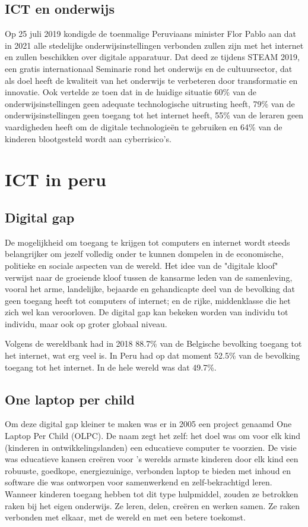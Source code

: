 \subsection{ICT en onderwijs}
Op 25 juli 2019 kondigde de toenmalige Peruviaans minister Flor Pablo aan dat in 2021 alle stedelijke onderwijsinstellingen verbonden zullen zijn met het internet en zullen beschikken over digitale apparatuur. Dat deed ze tijdens STEAM 2019, een gratis internationaal Seminarie rond het onderwijs en de cultuursector, dat als doel heeft de kwaliteit van het onderwijs te verbeteren door transformatie en innovatie. Ook vertelde ze toen dat in de huidige situatie 60\% van de onderwijsinstellingen geen adequate technologische uitrusting heeft, 79\% van de onderwijsinstellingen geen toegang tot het internet heeft, 55\% van de leraren geen vaardigheden heeft om de digitale technologieën te gebruiken en 64\% van de kinderen blootgesteld wordt aan cyberrisico's. \autocite{Ministerio de Educación}

\section{ICT in peru}
\subsection{Digital gap}
De mogelijkheid om toegang te krijgen tot computers en internet wordt steeds belangrijker om jezelf volledig onder te kunnen dompelen in de economische, politieke en sociale aspecten van de wereld. Het idee van de "digitale kloof" verwijst naar de groeiende kloof tussen de kansarme leden van de samenleving, vooral het arme, landelijke, bejaarde en gehandicapte deel van de bevolking dat geen toegang heeft tot computers of internet; en de rijke, middenklasse die het zich wel kan veroorloven. De digital gap kan bekeken worden van individu tot individu, maar ook op groter globaal niveau. \autocite{Marichick2000}

Volgens de wereldbank had in 2018 88.7\% van de Belgische bevolking toegang tot het internet, wat erg veel is. In Peru had op dat moment 52.5\% van de bevolking toegang tot het internet. In de hele wereld was dat 49.7\%. \autocite{WereldBank2018}

\subsection{One laptop per child}
Om deze digital gap kleiner te maken was er in 2005 een project genaamd One Laptop Per Child (OLPC). De naam zegt het zelf: het doel was om voor elk kind (kinderen in ontwikkelingslanden) een educatieve computer te voorzien. De visie was educatieve kansen creëren voor 's werelds armste kinderen door elk kind een robuuste, goedkope, energiezuinige, verbonden laptop te bieden met inhoud en software die was ontworpen voor samenwerkend en zelf-bekrachtigd leren. Wanneer kinderen toegang hebben tot dit type hulpmiddel, zouden ze betrokken raken bij het eigen onderwijs. Ze leren, delen, creëren en werken samen. Ze raken verbonden met elkaar, met de wereld en met een betere toekomst. \autocite{OneLaptopPerChild2005}


